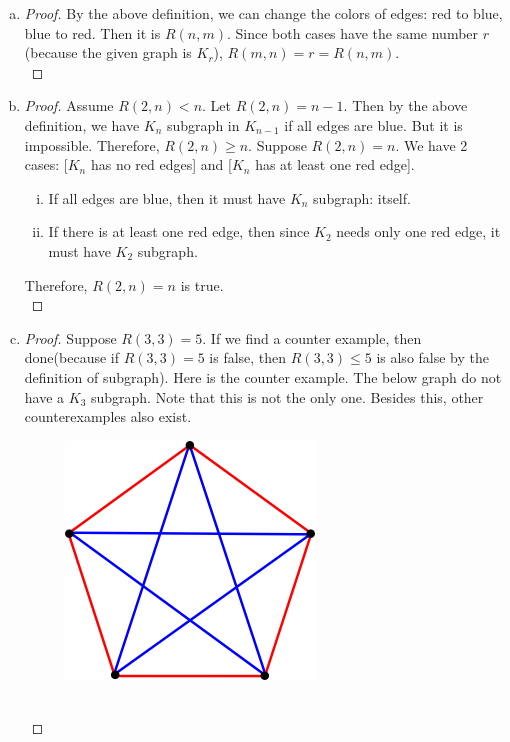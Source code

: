 	\begin{enumerate} [(a)]
		\item \begin{proof}
			By the above definition, we can change the colors of edges: red to blue, blue to red. Then it is $R(n, m)$. Since both cases have the same number $r$(because the given graph is $K_r$), $R(m, n) = r = R(n, m)$.\\
		\end{proof}
		\item \begin{proof}
			Assume $R(2, n) < n$. Let $R(2, n) = n - 1$. Then by the above definition, we have $K_n$ subgraph in $K_{n - 1}$ if all edges are blue. But it is impossible. Therefore, $R(2, n) \geq n$.
			Suppose $R(2, n) = n$. We have 2 cases: [$K_n$ has no red edges] and [$K_n$ has at least one red edge].
			\begin{enumerate} [i)]
				\item If all edges are blue, then it must have $K_n$ subgraph: itself.
				\item If there is at least one red edge, then since $K_2$ needs only one red edge, it must have $K_2$ subgraph.
			\end{enumerate}
			Therefore, $R(2, n) = n$ is true.\\
		\end{proof}
		\item \begin{proof}
			Suppose $R(3, 3) = 5$. If we find a counter example, then done(because if $R(3, 3) = 5$ is false, then $R(3, 3) \leq 5$ is also false by the definition of subgraph).
			Here is the counter example. The below graph do not have a $K_3$ subgraph. Note that this is not the only one. Besides this, other counterexamples also exist.
			\begin{figure}[htb!]
				\centering
				\includegraphics[width=0.4\columnwidth]{counter_example_R.png}
			\end{figure}\\
		\end{proof}
	\end{enumerate}
	